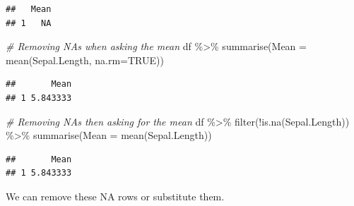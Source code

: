 \documentclass[
]{book}
\newenvironment{Shaded}{\begin{snugshade}}{\end{snugshade}}
\newcommand{\AttributeTok}[1]{\textcolor[rgb]{0.77,0.63,0.00}{#1}}
\newcommand{\CommentTok}[1]{\textcolor[rgb]{0.56,0.35,0.01}{\textit{#1}}}
\newcommand{\ConstantTok}[1]{\textcolor[rgb]{0.00,0.00,0.00}{#1}}
\newcommand{\FunctionTok}[1]{\textcolor[rgb]{0.00,0.00,0.00}{#1}}
\newcommand{\NormalTok}[1]{#1}
\newcommand{\OtherTok}[1]{\textcolor[rgb]{0.56,0.35,0.01}{#1}}
\newcommand{\SpecialCharTok}[1]{\textcolor[rgb]{0.00,0.00,0.00}{#1}}
\begin{document}
\begin{Shaded}
\end{Shaded}

\begin{verbatim}
##   Mean
## 1   NA
\end{verbatim}

\begin{Shaded}
\begin{Highlighting}[]
\CommentTok{\# Removing NAs when asking the mean}
\NormalTok{df }\SpecialCharTok{\%\textgreater{}\%} 
  \FunctionTok{summarise}\NormalTok{(}\AttributeTok{Mean =} \FunctionTok{mean}\NormalTok{(Sepal.Length, }\AttributeTok{na.rm=}\ConstantTok{TRUE}\NormalTok{))}
\end{Highlighting}
\end{Shaded}

\begin{verbatim}
##       Mean
## 1 5.843333
\end{verbatim}

\begin{Shaded}
\begin{Highlighting}[]
\CommentTok{\# Removing NAs then asking for the mean}
\NormalTok{df }\SpecialCharTok{\%\textgreater{}\%} 
  \FunctionTok{filter}\NormalTok{(}\SpecialCharTok{!}\FunctionTok{is.na}\NormalTok{(Sepal.Length)) }\SpecialCharTok{\%\textgreater{}\%} 
  \FunctionTok{summarise}\NormalTok{(}\AttributeTok{Mean =} \FunctionTok{mean}\NormalTok{(Sepal.Length))}
\end{Highlighting}
\end{Shaded}

\begin{verbatim}
##       Mean
## 1 5.843333
\end{verbatim}

We can remove these NA rows or substitute them.
\end{document}
